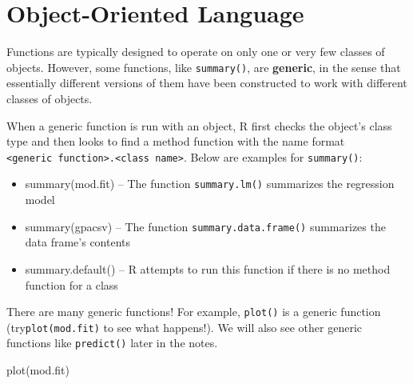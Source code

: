 \documentclass[
]{book}
\newenvironment{Shaded}{\begin{snugshade}}{\end{snugshade}}
\newcommand{\FunctionTok}[1]{\textcolor[rgb]{0.00,0.00,0.00}{#1}}
\newcommand{\NormalTok}[1]{#1}
\providecommand{\tightlist}{%
  \setlength{\itemsep}{0pt}\setlength{\parskip}{0pt}}
\begin{document}
\hypertarget{object-oriented-language}{%
\section{Object-Oriented Language}\label{object-oriented-language}}

Functions are typically designed to operate on only one or very few classes of objects. However, some functions, like \texttt{summary()}, are \textbf{generic}, in the sense that essentially different versions of them have been constructed to work with different classes of objects.

When a generic function is run with an object, R first checks the object's class type and then looks to find a method function with the name format \texttt{\textless{}generic\ function\textgreater{}.\textless{}class\ name\textgreater{}}. Below are examples for \texttt{summary()}:

\begin{itemize}
\tightlist
\item
  summary(mod.fit) -- The function \texttt{summary.lm()} summarizes the regression model
\item
  summary(gpacsv) -- The function \texttt{summary.data.frame()} summarizes the data frame's contents
\item
  summary.default() -- R attempts to run this function if there is no method function for a class
\end{itemize}

There are many generic functions! For example, \texttt{plot()} is a generic function (try\texttt{plot(mod.fit)} to see what happens!). We will also see other generic functions like \texttt{predict()} later in the notes.

\begin{Shaded}
\begin{Highlighting}[]
\FunctionTok{plot}\NormalTok{(mod.fit)}
\end{Highlighting}
\end{Shaded}
\end{document}
